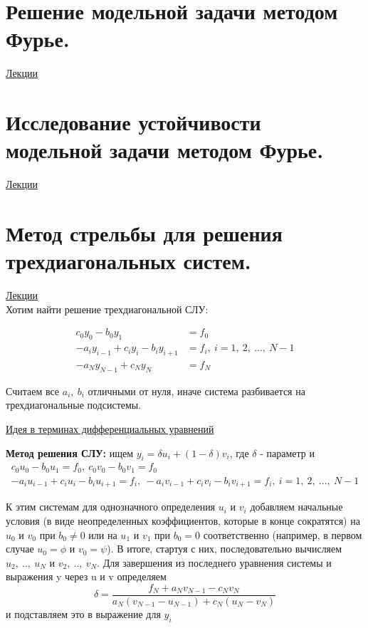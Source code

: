 \documentclass[specialist, subf, href, colorlinks=true, 12pt, times, mtpro, final]{disser}
\theoremstyle{definition}
\begin{document}
{\section {Решение модельной задачи методом Фурье.}
    \hyperlink {lects.109}{Лекции}\\

\section {Исследование устойчивости модельной задачи методом Фурье.}
    \hyperlink {lects.111}{Лекции}\\

\section {Метод стрельбы для решения трехдиагональных систем.}
    \hyperlink {lects.112}{Лекции}\\
    
\noindent Хотим найти решение трехдиагональной СЛУ:
    
\begin{equation}
\begin{aligned}
c_0 y_0 -  b_0 y_1 &= f_0 \\
-a_i y_{i-1} + c_i y_i - b_i y_{i+1} &= f_i,\ i = 1,\ 2,\ ...,\ N-1 \\
-a_N y_{N-1} + c_N y_N &= f_N
\end{aligned}
\end{equation}

\noindent Считаем все $a_i,\ b_i$ отличными от нуля, иначе система разбивается на трехдиагональные подсистемы. 

\noindent \hyperlink {lects.112}{Идея в терминах дифференциальных уравнений}

\noindent \textbf{Метод решения СЛУ:} ищем $y_i = \delta u_i + (1 - \delta) v_i$, где $\delta$ - параметр и
\begin{equation}
\begin{gathered}
c_0 u_0 -  b_0 u_1 = f_0,\ c_0 v_0 -  b_0 v_1 = f_0 \\
-a_i u_{i-1} + c_i u_i - b_i u_{i+1} = f_i,\ -a_i v_{i-1} + c_i v_i - b_i v_{i+1} = f_i,\ i = 1,\ 2,\ ...,\ N-1
\end{gathered}
\end{equation}

К этим системам для однозначного определения $u_i$ и $v_i$ добавляем начальные условия (в виде неопределенных коэффициентов, которые в конце сократятся) на $u_0$ и $v_0$ при $b_0 \ne 0$ или на $u_1$ и $v_1$ при $b_0 = 0$ соответственно (например, в первом случае $u_0 = \phi$ и $v_0 = \psi$). В итоге, стартуя с них, последовательно вычисляем $u_2,\ ..,\ u_N$ и $v_2,\ ..,\ v_N$. Для завершения из последнего уравнения системы и выражения y через u и v определяем 
$$
\delta = \frac{f_N + a_N v_{N-1} - c_N v_N}{a_N (v_{N-1} - u_{N-1}) + c_N (u_{N} - v_{N})}
$$
и подставляем это в выражение для $y_i$

}
\end{document}
